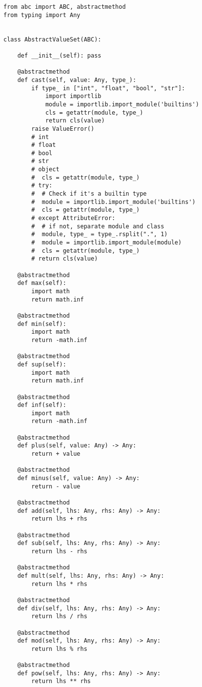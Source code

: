 \begin{verbatim}
from abc import ABC, abstractmethod
from typing import Any


class AbstractValueSet(ABC):

    def __init__(self): pass

    @abstractmethod
    def cast(self, value: Any, type_):
        if type_ in ["int", "float", "bool", "str"]:
            import importlib
            module = importlib.import_module('builtins')
            cls = getattr(module, type_)
            return cls(value)
        raise ValueError()
        # int
        # float
        # bool
        # str
        # object
        #  cls = getattr(module, type_)
        # try:
        #  # Check if it's a builtin type
        #  module = importlib.import_module('builtins')
        #  cls = getattr(module, type_)
        # except AttributeError:
        #  # if not, separate module and class
        #  module, type_ = type_.rsplit(".", 1)
        #  module = importlib.import_module(module)
        #  cls = getattr(module, type_)
        # return cls(value)

    @abstractmethod
    def max(self):
        import math
        return math.inf

    @abstractmethod
    def min(self):
        import math
        return -math.inf

    @abstractmethod
    def sup(self):
        import math
        return math.inf

    @abstractmethod
    def inf(self):
        import math
        return -math.inf

    @abstractmethod
    def plus(self, value: Any) -> Any:
        return + value

    @abstractmethod
    def minus(self, value: Any) -> Any:
        return - value

    @abstractmethod
    def add(self, lhs: Any, rhs: Any) -> Any:
        return lhs + rhs

    @abstractmethod
    def sub(self, lhs: Any, rhs: Any) -> Any:
        return lhs - rhs

    @abstractmethod
    def mult(self, lhs: Any, rhs: Any) -> Any:
        return lhs * rhs

    @abstractmethod
    def div(self, lhs: Any, rhs: Any) -> Any:
        return lhs / rhs

    @abstractmethod
    def mod(self, lhs: Any, rhs: Any) -> Any:
        return lhs % rhs

    @abstractmethod
    def pow(self, lhs: Any, rhs: Any) -> Any:
        return lhs ** rhs
\end{verbatim}

